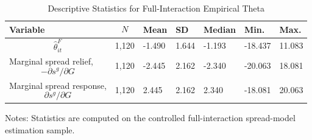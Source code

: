 \begin{table}[H]\centering
\begin{threeparttable}
\caption{Descriptive Statistics for Full-Interaction Empirical Theta}
\label{tab:theta_descriptive_stats}
\scriptsize
\begin{tabularx}{\textwidth}{lYYYYYY}
\toprule
Variable & $$N$$ & Mean & SD & Median & Min. & Max. \\
\midrule
$$\widehat{\theta}^{F}_{it}$$ & 1,120 & -1.490 & 1.644 & -1.193 & -18.437 & 11.083 \\
Marginal spread relief, $$-\partial s^g/\partial G$$ & 1,120 & -2.445 & 2.162 & -2.340 & -20.063 & 18.081 \\
Marginal spread response, $$\partial s^g/\partial G$$ & 1,120 & 2.445 & 2.162 & 2.340 & -18.081 & 20.063 \\
\bottomrule
\end{tabularx}
\begin{tablenotes}[flushleft]\footnotesize
\item Notes: Statistics are computed on the controlled full-interaction spread-model estimation sample.
\end{tablenotes}
\end{threeparttable}
\end{table}

